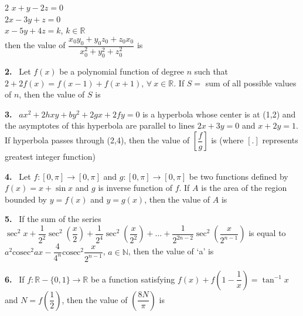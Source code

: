 \documentclass[10pt]{extarticle}
\newcommand{\qn}[1]{\par\smallskip\noindent\textbf{#1.}~}
\begin{document}
\begin{multicols}{2}
$x+y-2z=0$\\
$2x-3y+z=0$\\
$x-5y+4z=k$, $k\in\mathbb R$\\
then the value of $\dfrac{x_0y_0+y_0z_0+z_0x_0}{x_0^2+y_0^2+z_0^2}$ is
\qn{2} Let $f(x)$ be a polynomial function of degree $n$ such that $2+2f(x)=f(x-1)+f(x+1)$, $\forall\ x\in\mathbb R$. If $S=$ sum of all possible values of $n$, then the value of $S$ is
\qn{3} $ax^2+2hxy+by^2+2gx+2fy=0$ is a hyperbola whose center is at (1,2) and the asymptotes of this hyperbola are parallel to lines $2x+3y=0$ and $x+2y=1$. If hyperbola passes through (2,4), then the value of $\left[\dfrac fg\right]$ is (where $[.]$ represents greatest integer function)
\qn{4} Let $f:[0,\pi]\to[0,\pi]$ and $g:[0,\pi]\to[0,\pi]$ be two functions defined by $f(x)=x+\sin x$ and $g$ is inverse function of $f$. If $A$ is the area of the region bounded by $y=f(x)$ and $y=g(x)$, then the value of $A$ is
\qn{5} If the sum of the series $\sec^2x+\dfrac1{2^2}\sec^2\!\left(\dfrac x2\right)+\dfrac1{2^4}\sec^2\!\left(\dfrac x{2^2}\right)+\ldots+\dfrac1{2^{2n-2}}\sec^2\!\left(\dfrac x{2^{n-1}}\right)$ is equal to $a^2\text{cosec}^2ax-\dfrac4{4^n}\text{cosec}^2\dfrac x{2^{n-1}}$, $a\in\mathbb N$, then the value of `a' is
\qn{6} If $f:\mathbb R-\{0,1\}\to\mathbb R$ be a function satisfying $f(x)+f\!\left(1-\dfrac1x\right)=\tan^{-1}x$ and $N=f\!\left(\dfrac12\right)$, then the value of $\left(\dfrac{8N}{\pi}\right)$ is
\end{multicols}
\end{document}
